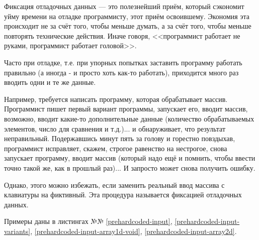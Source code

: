 \begin{notbadadvice}
	\label{NA_prehardcoded-input}

	Фиксация отладочных данных --- это полезнейший приём,
	который сэкономит уйму времени на отладке программисту, этот приём освоившему.
	Экономия эта происходит не за счёт того, чтобы меньше думать,
	а за счёт того, чтобы меньше повторять технические действия.
	Иначе говоря, <<программист работает не руками, программист работает головой>>.

	Часто при отладке, т.е. при упорных попытках заставить программу работать правильно
	(а иногда - и просто хоть как-то работать),
	приходится много раз вводить одни и те же данные.

	Например, требуется написать программу, которая обрабатывает массив.
	Программист пишет первый вариант программы, запускает его, вводит массив,
	возможно, вводит какие-то дополнительные данные
	(количество обрабатываемых элементов, число для сравнения и т.д.)...
	и обнаруживает, что результат неправильный.
	Подержавшись минут пять за голову и горестно повздыхав,
	программист исправляет, скажем, строгое равенство на нестрогое,
	снова запускает программу, вводит массив
	(который надо ещё и помнить, чтобы ввести точно такой же, как в прошлый раз)...
	И запросто может снова получить ошибку.

	Однако, этого можно избежать, если заменить реальный ввод массива с клавиатуры на фиктивный.
	Эта процедура называется фиксацией отладочных данных.

	Примеры даны в листингах №№
	\ref{prehardcoded-input},
	\ref{prehardcoded-input-variants},
	\ref{prehardcoded-input-array1d-void},
	\ref{prehardcoded-input-array2d}.


\end{notbadadvice}
